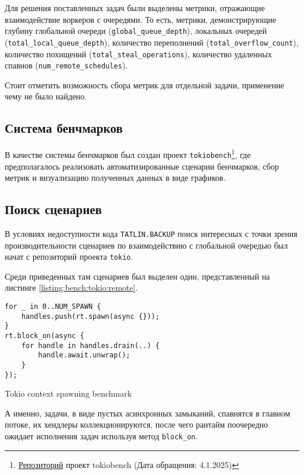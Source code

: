 Для решения поставленных задач были выделены метрики, отражающие взаимодействие воркеров с очередями. То есть, метрики, демонстрирующие глубину глобальной очереди (\verb|global_queue_depth|), локальных очередей (\verb|total_local_queue_depth|), количество переполнений (\verb|total_overflow_count|), количество похищений (\verb|total_steal_operations|), количество удаленных спавнов (\verb|num_remote_schedules|).

Стоит отметить возможность сбора метрик для отдельной задачи, применение чему не было найдено.

\subsection{Система бенчмарков}

В качестве системы бенчмарков был создан проект \verb|tokiobench|\footnote{\href{https://github.com/IgorErin/tokiobench}{Репозиторий} проект tokiobench (Дата обращения: 4.1.2025)}, где предполагалось реализовать автоматизированные сценарии бенчмарков, сбор метрик и визуализацию полученных данных в виде графиков.

\subsection{Поиск сценариев}

В условиях недоступности кода \verb|TATLIN.BACKUP| поиск интересных с точки зрения производительности сценариев по взаимодействию с глобальной очередью был начат с репозиторий проекта \verb|tokio|.

Среди приведенных там сценариев был выделен один, представленный на листинге \ref{listing:bench:tokio:remote}.

\begin{listing}[H]
    \begin{verbatim}
for _ in 0..NUM_SPAWN {
    handles.push(rt.spawn(async {}));
}
rt.block_on(async {
    for handle in handles.drain(..) {
        handle.await.unwrap();
    }
});
    \end{verbatim}

    \caption{Tokio context spawning benchmark}
    \label{listing:bench:tokio:remote}
\end{listing}

А именно, задачи, в виде пустых асинхронных замыканий, спавнятся в главном потоке, их хендлеры коллекционируются, после чего рантайм поочередно ожидает исполнения задач используя метод \verb|block_on|.

